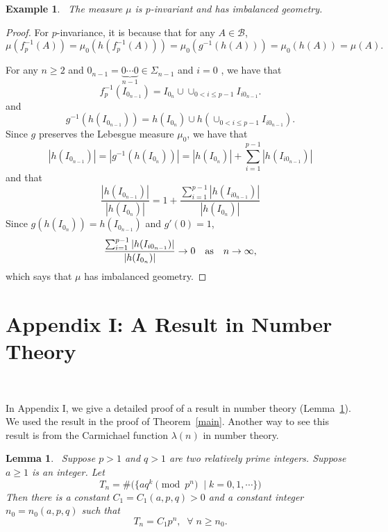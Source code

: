 \documentclass[11pt]{amsart}
\newtheorem{lemma}{Lemma}
\newtheorem{example}{Example}
\theoremstyle{definition}
\def\m{\mu}
\def\S{\Sigma}
\def\B{\mathcal{B}}
\begin{document}
\medskip
\begin{example}~\label{nex}
The measure $\m$ is $p$-invariant and has imbalanced geometry.
\end{example}

\begin{proof}
For $p$-invariance, it is because that for any $A\in \B$, 
$$
\m(f_{p}^{-1}(A)) =\m_{0} (h(f_{p}^{-1}(A))) =\m_{0} (g^{-1} (h(A))) = \m_{0} (h(A))=\m (A).
$$
 
For any $n\geq 2$ and $0_{n-1}=\underbrace{0\cdots 0}_{n-1} \in \S_{n-1}$ and $i=0$ , we have that 
$$
f_{p}^{-1} (I_{0_{n-1}}) = I_{0_{n}} \cup \cup_{0<i\leq p-1} I_{i0_{n-1}}.
$$
and 
$$
g^{-1} (h(I_{0_{n-1}})) =h(I_{0_{n}}) \cup h(\cup_{0<i\leq p-1}I_{i0_{n-1}}).
$$
Since $g$ preserves the Lebesgue measure $\m_{0}$, we have that
$$
|h(I_{0_{n-1}})| =|g^{-1} (h(I_{0_{n}}))| = |h(I_{0_{n}})| + \sum_{i=1}^{p-1} |h(I_{i0_{n-1}})|
$$
and that 
$$
 \frac{|h(I_{0_{n-1}})|}{|h(I_{0_{n}})|} = 1+
\frac{\sum_{i=1}^{p-1} |h(I_{i0_{n-1}})|}{|h(I_{0_{n}})|} 
$$
Since $g(h(I_{0_{n}}))=h(I_{0_{n-1}})$ and $g'(0)=1$, 
$$
\frac{\sum_{i=1}^{p-1} |h(I_{i0_{n-1}})|}{|h(I_{0_{n}})|} \to 0 \quad \hbox{as} \quad n\to \infty,
$$  
which says that $\mu$ has imbalanced geometry. 
 \end{proof}
 


\section{\bf Appendix I: A Result in Number Theory}~\label{rnt}

In Appendix I, we give a detailed proof of a result in number theory (Lemma~\ref{nt}). We used the result in the proof of Theorem~\ref{main}. Another way to see this result is from the Carmichael function $\lambda(n)$ in number theory. 

\medskip
\begin{lemma}~\label{nt} 
Suppose $p>1$ and $q>1$ are two relatively prime integers. Suppose $a\geq 1$ is an integer. 
Let 
$$
T_{n}=\#\Big(\{ aq^k \pmod{p^n}\;\;|\; k=0, 1, \cdots\}\Big)
$$
Then there is a constant $C_{1}=C_{1}(a,p,q)>0$ and a constant integer $n_{0}=n_{0}(a, p, q)$ such that 
$$
T_n=C_{1}p^n, \;\;\forall \; n\geq n_0.
$$
\end{lemma}
\end{document}

